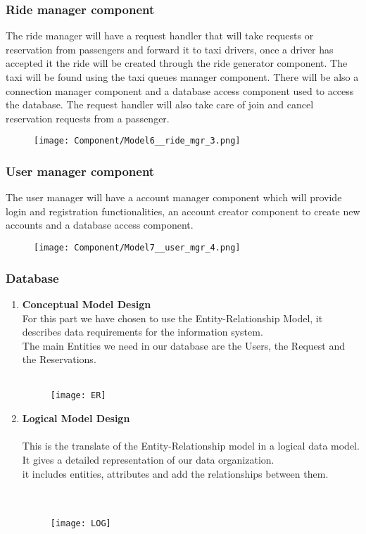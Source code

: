 	\subsubsection{Ride manager component}
		The ride manager will have a request handler that will take requests or reservation from passengers and forward it to taxi drivers, once a driver has accepted it the ride will be created through the ride generator component. The taxi will be found using the taxi queues manager component. There will be also a connection manager component and a database access component used to access the database.
		The request handler will also take care of join and cancel reservation requests from a passenger. 
		\begin{figure}[h!]
			\centering
			\texttt{[image: Component/Model6\_\_ride\_mgr\_3.png]}
		\end{figure}
		\newpage

	\subsubsection{User manager component}
		The user manager will have a account manager component which will provide login and registration functionalities, an account creator component to create new accounts and a database access component.
		\begin{figure}[h!]
			\centering
			\texttt{[image: Component/Model7\_\_user\_mgr\_4.png]}
		\end{figure}
		\newpage
		
	\subsubsection{Database}
	\begin{enumerate}
		\item \textbf{Conceptual Model Design}
		\\ For this part we have chosen to use the Entity-Relationship Model, it describes data requirements for the information system.
		\\ The main Entities we need in our database are the Users, the Request and the Reservations. \\ \\
	\begin{figure}[h!]
		\texttt{[image: ER]}
	\end{figure}
	\newpage		
	
	\item \textbf{Logical Model Design}
		\\ \\ This is the translate of the Entity-Relationship model in a logical data model. It gives a detailed representation of our data organization. \\ it includes entities, attributes and add the  relationships between them. \\ \\ \\
	\begin{figure}[h!]
		\texttt{[image: LOG]}
	\end{figure}
	\newpage	
	\end{enumerate}
	

